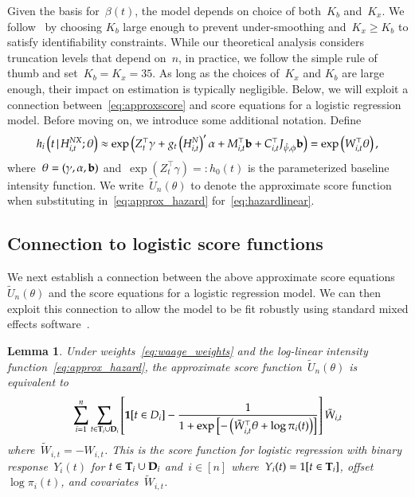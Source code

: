 \documentclass[12pt]{amsart}
\newtheorem{lemma}[thm]{Lemma}
\def\given{\, | \,}
\def\bfT{{\bf T}}
\def\bfD{{\bf D}}
\begin{document}
Given the basis for~$\beta(t)$, the model depends on choice of both~$K_b$ and~$K_x$.  We follow~\cite{Ruppert2002} by choosing $K_b$ large enough to prevent under-smoothing and~$K_x \geq K_b$ to satisfy identifiability constraints. While our theoretical analysis considers truncation levels that depend on~$n$, in practice, we follow the simple rule of thumb and set~$K_b = K_x = 35$. As long as the choices of~$K_x$ and $K_b$ are large enough, their impact on estimation is typically negligible. Below, we will exploit a connection between~\eqref{eq:approxscore} and score equations for a logistic regression model.  Before moving on, we introduce some additional notation. Define
\begin{equation}
\label{eq:approx_hazard}
h_i \left( t \given  H_{i,t}^{NX} ; \theta \right) \approx
\exp \left( Z_{t}^\top \gamma + g_t \left( H_{i,t}^{N} \right)^{\prime} \alpha
  + M_{i,t}^\top {\bf b} + C_{i,t}^\top J_{\hat \psi, \phi} {\bf b} \right)
= \exp \left( W_{i,t}^\top \theta \right),
\end{equation}
where~$\theta = (\gamma, \alpha, {\bf b})$ and~$\exp ( Z_{t}^\top \gamma) =: h_0 (t)$ is the parameterized baseline intensity function. We write~$\tilde U_n (\theta)$ to denote the approximate score function when substituting in~\eqref{eq:approx_hazard} for~\eqref{eq:hazardlinear}.

\subsection{Connection to logistic score functions}
\label{eq:logistication}

We next establish a connection between the above approximate score equations~$\tilde U_n (\theta)$ and the score equations for a logistic regression model. We can then exploit this connection to allow the model to be fit robustly using standard mixed effects software~\citep{Ruppert2002, McCulloch2001}.

\begin{lemma} \normalfont
\label{lemma:logistic}
Under weights~\eqref{eq:waage_weights} and the log-linear intensity function~\eqref{eq:approx_hazard}, the approximate score function~$\tilde U_n (\theta)$ is equivalent to
\[
\sum_{i=1}^n \sum_{t \in \bfT_i \cup \bfD_i } \left[ {\bf 1}[t \in D_i]
  - \frac{1}{1 + \exp \left[- \left( \tilde{W}_{i,t}^\top \theta +
        \log \pi_i (t) \right) \right]} \right] \tilde{W}_{i,t}
\]
where~$\tilde W_{i,t} = -W_{i,t}$. This is the score function for logistic regression with binary response~$Y_i(t)$ for $t \in \bfT_i \cup \bfD_i$ and~$i \in [n]$ where~$Y_i(t) = 1[t \in \bfT_i]$, offset~$\log \pi_i (t)$, and covariates~$\tilde W_{i,t}$.
\end{lemma}
\end{document}
